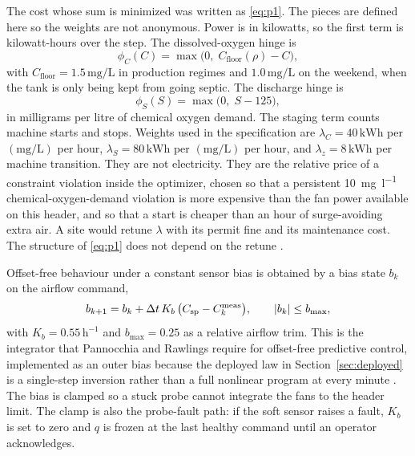 The cost whose sum is minimized was written as \eqref{eq:p1}. The pieces are defined here so the weights are not anonymous. Power is in kilowatts, so the first term is kilowatt-hours over the step. The dissolved-oxygen hinge is
\begin{equation}
\label{eq:hinge-c}
\phi_{C}(C)
=
\max\!\big(0,\; C_{\mathrm{floor}}(\rho)-C\big),
\end{equation}
with $C_{\mathrm{floor}}=1.5\,\mathrm{mg/L}$ in production regimes and $1.0\,\mathrm{mg/L}$ on the weekend, when the tank is only being kept from going septic. The discharge hinge is
\begin{equation}
\label{eq:hinge-s}
\phi_{S}(S)
=
\max\!\big(0,\; S-125\big),
\end{equation}
in milligrams per litre of chemical oxygen demand. The staging term counts machine starts and stops. Weights used in the specification are $\lambda_{C}=40\,\mathrm{kWh}$ per $(\mathrm{mg/L})$ per hour, $\lambda_{S}=80\,\mathrm{kWh}$ per $(\mathrm{mg/L})$ per hour, and $\lambda_{z}=8\,\mathrm{kWh}$ per machine transition. They are not electricity. They are the relative price of a constraint violation inside the optimizer, chosen so that a persistent \SI{10}{\milli\gram\per\litre} chemical-oxygen-demand violation is more expensive than the fan power available on this header, and so that a start is cheaper than an hour of surge-avoiding extra air. A site would retune $\lambda$ with its permit fine and its maintenance cost. The structure of \eqref{eq:p1} does not depend on the retune \cite{ellis2014empc,zeng2015empc,stare2007}.

Offset-free behaviour under a constant sensor bias is obtained by a bias state $b_{k}$ on the airflow command,
\begin{equation}
\label{eq:bias}
b_{k+1}
=
b_{k}
+
\Delta t\,
K_{b}\,\big(C_{\mathrm{sp}}-C^{\mathrm{meas}}_{k}\big),
\qquad
\left\lvert b_{k} \right\rvert\le b_{\max},
\end{equation}
with $K_{b}=0.55\,\mathrm{h^{-1}}$ and $b_{\max}=0.25$ as a relative airflow trim. This is the integrator that Pannocchia and Rawlings require for offset-free predictive control, implemented as an outer bias because the deployed law in Section~\ref{sec:deployed} is a single-step inversion rather than a full nonlinear program at every minute \cite{pannocchia2003offset}. The bias is clamped so a stuck probe cannot integrate the fans to the header limit. The clamp is also the probe-fault path: if the soft sensor raises a fault, $K_{b}$ is set to zero and $q$ is frozen at the last healthy command until an operator acknowledges.

